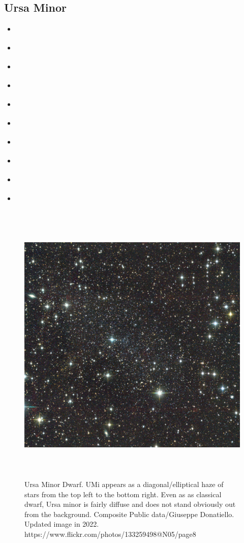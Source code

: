 \subsection{Ursa Minor}\label{ursa-minor}

\begin{itemize}
\item
  \citet{sestito+2023b}
\item
  \citet{pace+2020}
\item
  \citet{bellazzini+2002}
\item
  \citet{hargreaves+1994}
\item
  \citet{martinez-delgado+2001}
\item
  \citet{munoz+2005}
\item
  \citet{pace+2020}
\item
  \citet{palma+2003}
\item
  \citet{spencer+2018}
\item
  \citet{vitral+2023}
\end{itemize}

\begin{figure}
\centering
\includegraphics[width=5.41667in,height=5.41667in]{figures/umi_image.jpg}
\caption[Picture of Ursa Minor]{Ursa Minor Dwarf. UMi appears as a
diagonal/elliptical haze of stars from the top left to the bottom right.
Even as as classical dwarf, Ursa minor is fairly diffuse and does not
stand obviously out from the background. Composite Public data/Giuseppe
Donatiello. Updated image in 2022.
https://www.flickr.com/photos/133259498@N05/page8}\label{fig:umi_image}
\end{figure}

